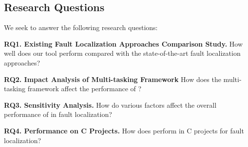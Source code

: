 \subsection{Research Questions}

We seek to answer the following research questions:

\noindent\textbf{RQ1. Existing Fault Localization Approaches Comparison Study.} How well does our tool perform compared with the state-of-the-art fault localization approaches?

\noindent\textbf{RQ2. Impact Analysis of Multi-tasking Framework} How does the multi-tasking framework affect the performance of \tool?

\noindent\textbf{RQ3. Sensitivity Analysis.} How do various factors affect the overall performance of \tool in fault localization?


\noindent\textbf{RQ4. Performance on C Projects.} How does \tool perform in C projects for fault localization?